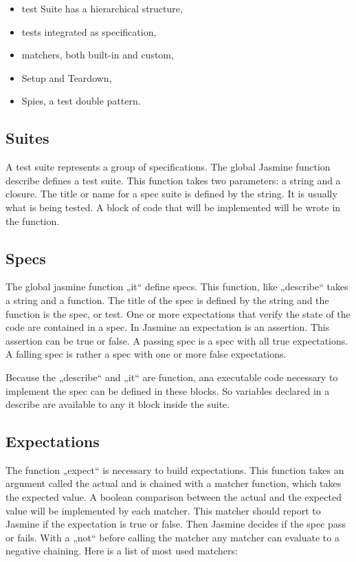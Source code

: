 \documentclass[11pt]{article}
\begin{document}
\begin{itemize}
\item test Suite has a hierarchical structure,
\item tests integrated as specification,
\item matchers, both built-in and custom,
\item Setup and Teardown,
\item Spies, a test double pattern.
\end{itemize}

\subsection{Suites}

A test suite represents a group of specifications. The global Jasmine function describe defines a test suite. This function takes two parameters: a string and a closure. The title or name for a spec suite is defined by the string. It is usually what is being tested. A block of code that will be implemented will be wrote in the function.

\subsection{Specs}

The global jasmine function „it“ define specs. This function, like „describe“ takes a string and a function. The title of the spec is defined by the string and the function is the spec, or test. One or more expectations that verify the state of the code are contained in a spec. In Jasmine an expectation is an assertion. This assertion can be true or false. A passing spec is a spec with all true expectations. A falling spec is rather a spec with one or more false expectations. 

Because the „describe“ and „it“ are function, ana executable code necessary to implement the spec can be defined in these blocks. So variables declared in a describe are available to any it block inside the suite.

\subsection{Expectations}

The function „expect“ is necessary to build expectations. This function takes an argument called the actual and is chained with a matcher function, which takes the expected value. A boolean comparison between the actual and the expected value will be implemented by each matcher. This matcher should report to Jasmine if the expectation is true or false. Then Jasmine decides if the spec pass or fails. With a „not“ before calling the matcher any matcher can evaluate to a negative chaining. Here is a list of most used matchers:
\end{document}
